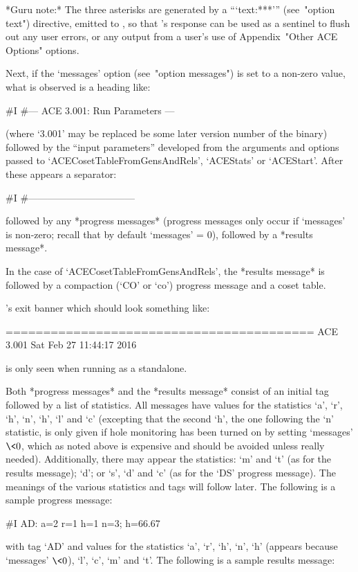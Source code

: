 *Guru note:*
The three asterisks are generated  by  a  ```text:***'''  (see~"option
text") directive, emitted to {\ACE}, so that {\ACE}'s response can  be
used as a sentinel to flush out any user errors, or any output from  a
user's use of Appendix~"Other ACE Options" options.

Next, if the `messages' option (see~"option messages")  is  set  to  a
non-zero value, what is observed is a heading like:

\begintt
#I    #--- ACE 3.001: Run Parameters ---
\endtt

(where `3.001' may be replaced be some later  version  number  of  the
{\ACE} binary) followed by the ``input parameters'' developed from the
arguments  and  options  passed   to   `ACECosetTableFromGensAndRels',
`ACEStats' or `ACEStart'. After these appears a separator:

\begintt
#I    #---------------------------------
\endtt

followed by any *progress messages* (progress messages only  occur  if
`messages' is non-zero;  recall  that  by  default  `messages'  =  0),
followed by a *results message*.

In the case of `ACECosetTableFromGensAndRels', the  *results  message*
is followed by a compaction (`CO' or  `co')  progress  message  and  a
coset table.

{\ACE}'s exit banner which should look something like:

\begintt
=========================================
ACE 3.001        Sat Feb 27 11:44:17 2016
\endtt

is only seen when running {\ACE} as a standalone.

Both *progress messages* and  the  *results  message*  consist  of  an
initial tag followed by a list of statistics. All messages have values
for the statistics `a', `r', `h', `n', `h',  `l'  and  `c'  (excepting
that the second `h', the one following  the  `n'  statistic,  is  only
given if hole monitoring has been turned on by setting `messages'  $\<
0$, which as noted above is expensive and  should  be  avoided  unless
really needed). Additionally, there may appear the statistics: `m' and
`t' (as for the results message); `d'; or `s', `d' and `c' (as for the
`DS' progress message). The meanings of  the  various  statistics  and
tags will follow later. The following is a sample progress message:

\begintt
#I  AD: a=2 r=1 h=1 n=3; h=66.67%
\endtt

with tag `AD' and values for the statistics `a', `r',  `h',  `n',  `h'
(appears because `messages' $\<  0$),  `l',  `c',  `m'  and  `t'.  The
following is a sample results message:


